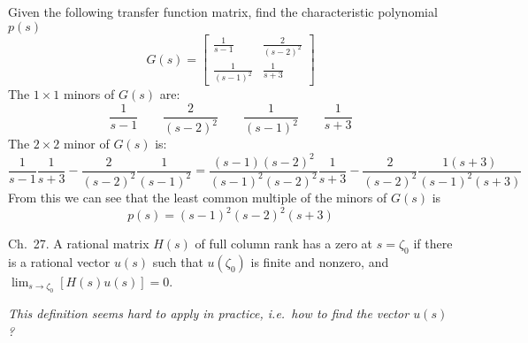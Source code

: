 \begin{example}
  Given the following transfer function matrix, find the characteristic polynomial $p(s)$
  \begin{equation*}
  G(s)=
  \begin{bmatrix}
  \frac{1}{s-1}& \frac{2}{(s-2)^{2}} \\
  \frac{1}{(s-1)^{2}} & \frac{1}{s+3}
  \end{bmatrix}
  \end{equation*}
  The $1\times1$ minors of $G(s)$ are:
  \begin{equation*}
  \frac{1}{s-1}
  \qquad
  \frac{2}{(s-2)^{2}}
  \qquad
  \frac{1}{(s-1)^{2}}
  \qquad
  \frac{1}{s+3}
  \end{equation*}
  The $2\times2$ minor of $G(s)$ is:
  \begin{equation*}
  \frac{1}{s-1}\frac{1}{s+3}-\frac{2}{(s-2)^{2}}\frac{1}{(s-1)^{2}}
  =
  \frac{(s-1)(s-2)^{2}}{(s-1)^{2}(s-2)^{2}}\frac{1}{s+3}-\frac{2}{(s-2)^{2}}\frac{1(s+3)}{(s-1)^{2}(s+3)}
  \end{equation*}
  From this we can see that the least common multiple of the minors of $G(s)$ is
  \begin{equation*}
  p(s)=(s-1)^{2}(s-2)^2(s+3)
  \end{equation*}
\end{example}

\begin{defn-dan}\label{definition.adaptive.transmission_zero}\cite{dahleh.lectures.2011}
  Ch.\ 27.
  A rational matrix $H(s)$ of full column rank has a zero at $s=\zeta_{0}$ if there is a rational vector $u(s)$ such that $u(\zeta_{0})$ is finite and nonzero, and $\lim_{s\rightarrow\zeta_{0}}[H(s)u(s)]=0$.
\end{defn-dan}

\textit{This definition seems hard to apply in practice, i.e.\ how to find the vector $u(s)$?}

